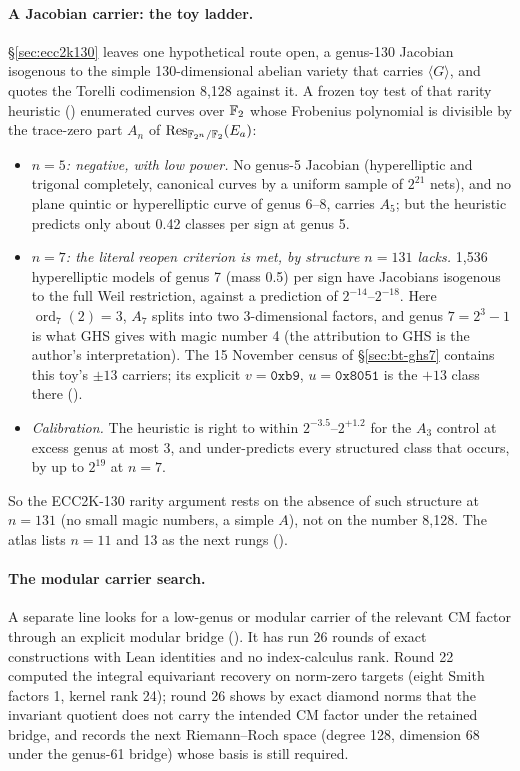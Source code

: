 \paragraph{A Jacobian carrier: the toy ladder.} \S\ref{sec:ecc2k130} leaves
one hypothetical route open, a genus-130 Jacobian isogenous to the simple
130-dimensional abelian variety that carries $\langle G\rangle$, and quotes
the Torelli codimension 8{,}128 against it. A frozen toy test of that rarity
heuristic ()
enumerated curves over $\mathbb{F}_2$ whose Frobenius polynomial is divisible by
the trace-zero part $A_n$ of $\mathrm{Res}_{\mathbb{F}_{2^n}/\mathbb{F}_2}(E_a)$:
\begin{itemize}
\item \emph{$n=5$: negative, with low power.} No genus-5 Jacobian
  (hyperelliptic and trigonal completely, canonical curves by a uniform
  sample of $2^{21}$ nets), and no plane quintic or hyperelliptic curve of
  genus 6--8, carries $A_5$; but the heuristic predicts only about 0.42
  classes per sign at genus 5.
\item \emph{$n=7$: the literal reopen criterion is met, by structure $n=131$
  lacks.} 1{,}536 hyperelliptic models of genus 7 (mass 0.5) per sign have
  Jacobians isogenous to the full Weil restriction, against a prediction of
  $2^{-14}$--$2^{-18}$. Here $\operatorname{ord}_7(2)=3$, $A_7$ splits into
  two 3-dimensional factors, and genus $7=2^3-1$ is what GHS gives with
  magic number 4 (the attribution to GHS is the author's interpretation).
  The 15 November census of \S\ref{sec:bt-ghs7} contains this
  toy's $\pm13$ carriers; its explicit $v=\texttt{0xb9}$,
  $u=\texttt{0x8051}$ is the $+13$ class there
  ().
\item \emph{Calibration.} The heuristic is right to within
  $2^{-3.5}$--$2^{+1.2}$ for the $A_3$ control at excess genus at most 3,
  and under-predicts every structured class that occurs, by up to $2^{19}$
  at $n=7$.
\end{itemize}
So the ECC2K-130 rarity argument rests on the absence of such structure at
$n=131$ (no small magic numbers, a simple $A$), not on the number 8{,}128.
The atlas lists $n=11$ and 13 as the next rungs
().

\paragraph{The modular carrier search.} A separate line looks for a
low-genus or modular carrier of the relevant CM factor through an explicit
modular bridge (). It
has run 26 rounds of exact constructions with Lean identities and no
index-calculus rank. Round 22 computed the integral equivariant recovery on
norm-zero targets (eight Smith factors 1, kernel rank 24); round 26 shows by
exact diamond norms that the invariant quotient does not carry the intended
CM factor under the retained bridge, and records the next Riemann--Roch
space (degree 128, dimension 68 under the genus-61 bridge) whose basis is
still required.

